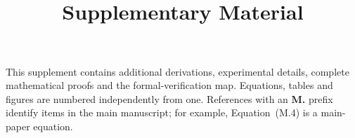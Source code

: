 \documentclass[10pt]{article}
\title{\papertitle\\[5pt]\large Supplementary Material}
\author{}
\date{}
\begin{document}
\maketitle
\thispagestyle{fancy}
\noindent This supplement contains additional derivations, experimental details,
complete mathematical proofs and the formal-verification map. Equations,
tables and figures are numbered independently from one. References with an
\textbf{M.} prefix identify items in the main manuscript; for example,
Equation~(M.4) is a main-paper equation.

\FloatBarrier


\end{document}
